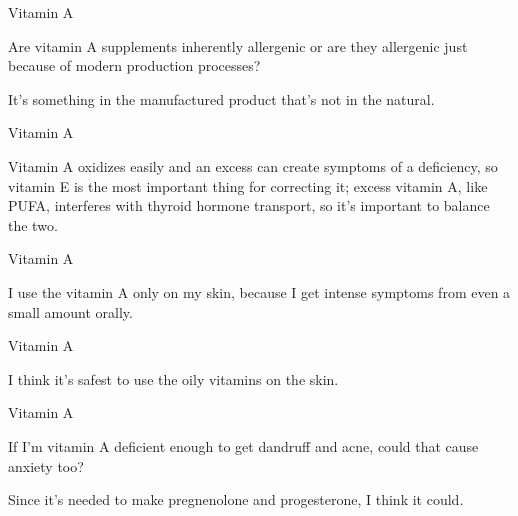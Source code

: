 \documentclass[11pt,oneside,openany,extrafontsizes]{memoir}
\begin{document}
\begin{qaexchange}{Vitamin A}

    \begin{question}
        Are vitamin A supplements inherently allergenic or are they allergenic just because of modern production processes?
    \end{question}

    \begin{answer}
        It's something in the manufactured product that's not in the natural.
    \end{answer}
\end{qaexchange}

\begin{standalonequote}{Vitamin A}

    \begin{answer}
        Vitamin A oxidizes easily and an excess can create symptoms of a deficiency, so vitamin E is the most important thing for correcting it; excess vitamin A, like PUFA, interferes with thyroid hormone transport, so it's important to balance the two.
    \end{answer}
\end{standalonequote}

\begin{standalonequote}{Vitamin A}

    \begin{answer}
        I use the vitamin A only on my skin, because I get intense symptoms from even a small amount orally.
    \end{answer}
\end{standalonequote}

\begin{standalonequote}{Vitamin A}

    \begin{answer}
        I think it's safest to use the oily vitamins on the skin.
    \end{answer}
\end{standalonequote}

\begin{qaexchange}{Vitamin A}

    \begin{question}
        If I'm vitamin A deficient enough to get dandruff and acne, could that cause anxiety too?
    \end{question}

    \begin{answer}
        Since it's needed to make pregnenolone and progesterone, I think it could.
    \end{answer}
\end{qaexchange}
\end{document}

